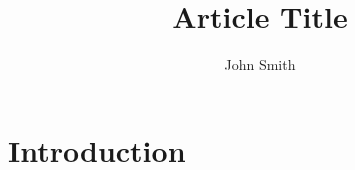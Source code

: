 \documentclass{article}
\title{Article Title}
\author{John Smith}
\begin{document}
\maketitle

\section{Introduction}
\blindtext



\end{document}
